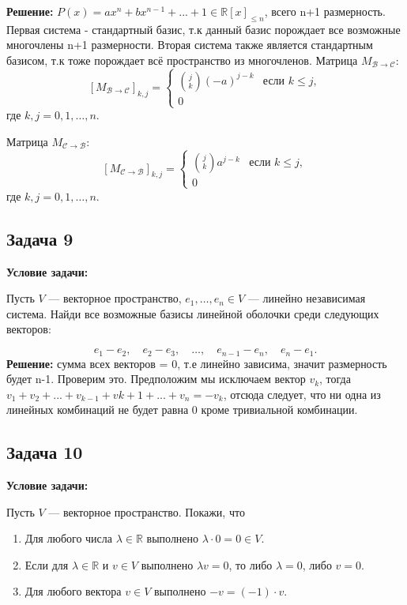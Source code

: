 \documentclass[a4paper,12pt]{article}
\begin{document}
\textbf{Решение: }
$P(x)=ax^n+bx^{n-1}+...+1 \in \mathbb{R}[x]_{\leq n}$, всего n+1 размерность. Первая система - стандартный базис, т.к данный базис порождает все возможные многочлены n+1 размерности. Вторая система также является стандартным базисом, т.к тоже порождает всё пространство из многочленов.  Матрица \( M_{\mathcal{B} \to \mathcal{C}} \):
  \[
  \left[ M_{\mathcal{B} \to \mathcal{C}} \right]_{k,j} = \begin{cases}
  \binom{j}{k} (-a)^{j - k} & \text{если } k \leq j, \\
  0 
  \end{cases}
  \]
  где \( k, j = 0, 1, \dots, n \).

Матрица \( M_{\mathcal{C} \to \mathcal{B}} \):
  \[
  \left[ M_{\mathcal{C} \to \mathcal{B}} \right]_{k,j} = \begin{cases}
  \binom{j}{k} a^{j - k} & \text{если } k \leq j, \\
  0 
  \end{cases}
  \]
  где \( k, j = 0, 1, \dots, n \).
\vspace{0.5cm}

\subsection{Задача 9}

\textbf{Условие задачи:}

Пусть $V$ — векторное пространство, $e_1,\ldots,e_n \in V$ — линейно независимая система. Найди все возможные базисы линейной оболочки среди следующих векторов:

\[
e_1 - e_2,\quad e_2 - e_3,\quad \ldots,\quad e_{n-1} - e_n,\quad e_n - e_1.
\]
\textbf{Решение:}
сумма всех векторов = 0, т.е линейно зависима, значит размерность будет n-1. Проверим это. Предположим мы исключаем вектор $v_k$, тогда $v_1+v_2+...+v_{k-1}+v{k+1}+...+v_n=-v_k$, отсюда следует, что ни одна из линейных комбинаций не будет равна 0 кроме тривиальной комбинации.

\vspace{0.5cm}

\subsection{Задача 10}

\textbf{Условие задачи:}

Пусть $V$ — векторное пространство. Покажи, что

\begin{enumerate}
    \item Для любого числа $\lambda \in \mathbb{R}$ выполнено $\lambda \cdot 0 = 0 \in V$.
    \item Если для $\lambda \in \mathbb{R}$ и $v \in V$ выполнено $\lambda v = 0$, то либо $\lambda = 0$, либо $v = 0$.
    \item Для любого вектора $v \in V$ выполнено $-v = (-1) \cdot v$.
\end{enumerate}
\end{document}
